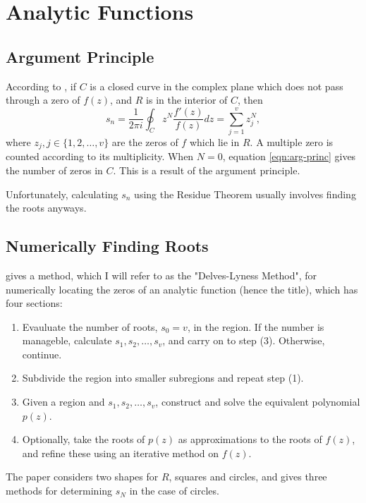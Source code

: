 \documentclass{article}
\begin{document}
\section{Analytic Functions}

\subsection{Argument Principle}

According to \cite{delves1967numerical},
if $C$ is a closed curve in the complex plane which does not pass through a zero of $f(z)$, and $R$ is in the interior of $C$, 
then
\begin{equation}\label{eqn:arg-princ}
	s_n=\frac{1}{2\pi i}\oint_Cz^N\frac{f'(z)}{f(z)}dz=\sum_{j=1}^vz_j^N,
\end{equation}
where $z_j,j\in\{1,2,\dots,v\}$ are the zeros of $f$ which lie in $R$.
A multiple zero is counted according to its multiplicity.
When $N=0$, equation \ref{eqn:arg-princ} gives the number of zeros in $C$.
This is a result of the argument principle.\cite{wiki:argument-principle}

Unfortunately, calculating $s_n$ using the Residue Theorem usually involves finding the roots anyways.

\subsection{Numerically Finding Roots}

\cite{delves1967numerical} gives a method, which I will refer to as the "Delves-Lyness Method", for numerically locating the zeros of an analytic function (hence the title),
which has four sections:
\begin{enumerate}
	\item Evauluate the number of roots, $s_0=v$, in the region.
	If the number is manageble, calculate $s_1,s_2,\dots,s_v$, and carry on to step (3).
	Otherwise, continue.
	\item
	Subdivide the region into smaller subregions and repeat step (1).
	\item Given a region and $s_1,s_2,\dots,s_v$, construct and solve the equivalent polynomial $p(z)$.
	\item Optionally, take the roots of $p(z)$ as approximations to the roots of $f(z)$,
	and refine these using an iterative method on $f(z)$.
\end{enumerate}
The paper considers two shapes for $R$, squares and circles, 
and  gives three methods for determining $s_N$ in the case of circles.

\printbibliography
\end{document}
